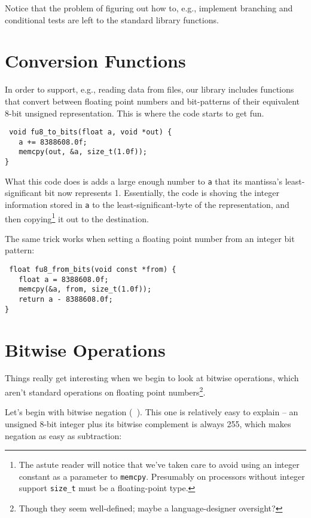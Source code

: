 \documentclass{acmsiggraph}
\theoremstyle{remark}
\theoremstyle{definition}
\begin{document}
Notice that the problem of figuring out how to, e.g., implement branching and conditional tests are left to the standard library functions.

\section{Conversion Functions}
In order to support, e.g., reading data from files, our library includes functions that convert between floating point numbers and bit-patterns of their equivalent 8-bit unsigned representation.
This is where the code starts to get fun.

{\tt
void fu8\_to\_bits(float a, void *out) \{ \\
$\phantom{XX}$a += 8388608.0f; \\
$\phantom{XX}$memcpy(out, \&a, size\_t(1.0f)); \\
\}
}

What this code does is adds a large enough number to {\tt a} that its mantissa's least-significant bit now represents 1.
Essentially, the code is shoving the integer information stored in {\tt a} to the least-significant-byte of the representation, and then copying\footnote{
The astute reader will notice that we've taken care to avoid using an integer constant as a parameter to {\tt memcpy}.
Presumably on processors without integer support {\tt size\_t} must be a floating-point type.
} it out to the destination.

The same trick works when setting a floating point number from an integer bit pattern:

{\tt
float fu8\_from\_bits(void const *from) \{ \\
$\phantom{XX}$float a = 8388608.0f; \\
$\phantom{XX}$memcpy(\&a, from, size\_t(1.0f)); \\
$\phantom{XX}$return a - 8388608.0f; \\
\}
}


\section{Bitwise Operations}

Things really get interesting when we begin to look at bitwise operations, which aren't standard operations on floating point numbers\footnote{Though they seem well-defined; maybe a language-designer oversight?}.

Let's begin with bitwise negation ({\tt ~}).
This one is relatively easy to explain -- an unsigned 8-bit integer plus its bitwise complement is always 255, which makes negation as easy as subtraction:
\end{document}
